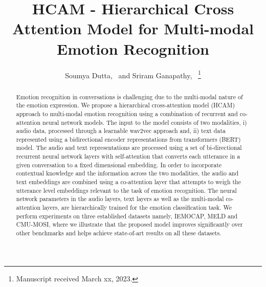 \documentclass[lettersize,journal]{IEEEtran}
\begin{document}
\title{HCAM - Hierarchical Cross Attention Model for Multi-modal Emotion Recognition}

\author{Soumya Dutta,~ and 
        Sriram Ganapathy,~
\thanks{Manuscript received March xx, 2023.}}




\maketitle

\begin{abstract}
Emotion recognition in conversations is challenging due to the multi-modal nature of the emotion expression. 
We propose a hierarchical cross-attention model (HCAM) approach to multi-modal emotion recognition using a combination of recurrent and co-attention neural network models. The input to the model consists of two modalities, i) audio data, processed through a learnable wav2vec approach and, ii) text data represented using a bidirectional encoder representations from transformers (BERT) model. The audio and text representations are processed using a set of bi-directional recurrent neural network layers with self-attention that converts each utterance in a given conversation to a fixed dimensional embedding. In order to incorporate contextual knowledge and the information across the two modalities,  the audio and text embeddings are combined using a co-attention layer that attempts to weigh the utterance level embeddings relevant to the task of emotion recognition. 
The neural network parameters in the audio layers, text layers as well as the multi-modal co-attention layers, are hierarchically trained for the emotion classification task.
We perform experiments on three established datasets namely, IEMOCAP, MELD and CMU-MOSI, where we illustrate that the proposed model improves significantly over other benchmarks and helps achieve state-of-art results on all these datasets.  
\end{abstract}
\end{document}
